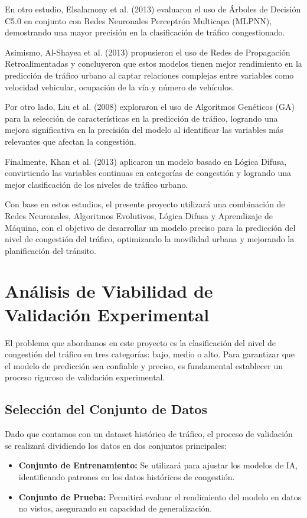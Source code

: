 \documentclass{svproc} %
\begin{document}
En otro estudio, Elsalamony et al. (2013) evaluaron el uso de Árboles de Decisión C5.0 en conjunto con Redes Neuronales
Perceptrón Multicapa (MLPNN), demostrando una mayor precisión en la clasificación de
tráfico congestionado.

Asimismo, Al-Shayea et al. (2013) propusieron el uso de Redes de Propagación
Retroalimentadas y concluyeron que estos modelos tienen mejor rendimiento en la
predicción de tráfico urbano al captar relaciones complejas entre variables como
velocidad vehicular, ocupación de la vía y número de vehículos.

Por otro lado, Liu et al. (2008) exploraron el uso de Algoritmos Genéticos (GA) para la
selección de características en la predicción de tráfico, logrando una mejora significativa
en la precisión del modelo al identificar las variables más relevantes que afectan la
congestión.

Finalmente, Khan et al. (2013) aplicaron un modelo basado en Lógica
Difusa, convirtiendo las variables continuas en categorías de congestión y logrando una
mejor clasificación de los niveles de tráfico urbano.

Con base en estos estudios, el presente proyecto utilizará una combinación de Redes
Neuronales, Algoritmos Evolutivos, Lógica Difusa y Aprendizaje de Máquina, con el
objetivo de desarrollar un modelo preciso para la predicción del nivel de congestión del
tráfico, optimizando la movilidad urbana y mejorando la planificación del tránsito.

\section{Análisis de Viabilidad de Validación Experimental}
El problema que abordamos en este proyecto es la clasificación del nivel de congestión del tráfico en tres categorías: bajo, medio o alto. Para garantizar que el modelo de predicción sea confiable y preciso, es fundamental establecer un proceso riguroso de validación experimental. 
\subsection{Selección del Conjunto de Datos}
Dado que contamos con un dataset histórico de tráfico, el proceso de validación se realizará dividiendo los datos en dos conjuntos principales: 
\begin{itemize}
    \item \textbf{Conjunto de Entrenamiento: } Se utilizará para ajustar los modelos de IA, identificando patrones en los datos históricos de congestión.
    \item \textbf{Conjunto de Prueba: } Permitirá evaluar el rendimiento del modelo en datos no vistos, asegurando su capacidad de generalización.
\end{itemize}
\end{document}
